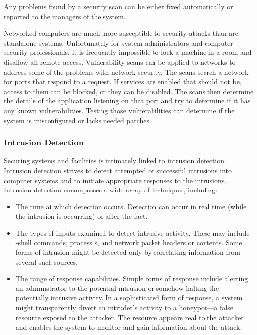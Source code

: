 Any problems found by a security scan can be either fixed automatically or reported to the managers of the system.

Networked computers are much more susceptible to security attacks than are standalone systems.
Unfortunately for system administrators and computer-security professionals, it is frequently impossible to lock a machine in a room and disallow all remote access.
Vulnerability scans can be applied to networks to address some of the problems with network security.
The scans search a network for ports that respond to a request.
If services are enabled that should not be, access to them can be blocked, or they can be disabled.
The scans then determine the details of the application listening on that port and try to determine if it has any known vulnerabilities.
Testing those vulnerabilities can determine if the system is misconfigured or lacks needed patches.

\subsubsection{Intrusion Detection}\label{subsubsec:Intrusion_Detection}
Securing systems and facilities is intimately linked to intrusion detection.
Intrusion detection strives to detect attempted or successful intrusions into computer systems and to initiate appropriate responses to the intrusions.
Intrusion detection encompasses a wide array of techniques, including:
\begin{itemize}[noitemsep]
\item The time at which detection occurs.
  Detection can occur in real time (while the intrusion is occurring) or after the fact.
\item The types of inputs examined to detect intrusive activity.
  These may include -shell commands, process s, and network packet headers or contents.
  Some forms of intrusion might be detected only by correlating information from several such sources.
\item The range of response capabilities.
  Simple forms of response include alerting an administrator to the potential intrusion or somehow halting the potentially intrusive activity.
  In a sophisticated form of response, a system might transparently divert an intruder’s activity to a honeypot—a false resource exposed to the attacker.
  The resource appears real to the attacker and enables the system to monitor and gain information about the attack.
\end{itemize}

